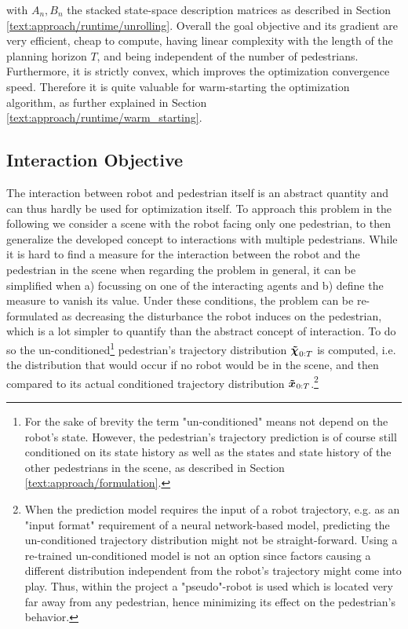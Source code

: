with $A_n, B_n$ the stacked state-space description matrices as described in Section \ref{text:approach/runtime/unrolling}. 
\newline
Overall the goal objective and its gradient are very efficient, cheap to compute, having linear complexity with the length of the planning horizon $T$, and being independent of the number of pedestrians. Furthermore, it is strictly convex, which improves the optimization convergence speed. Therefore it is quite valuable for warm-starting the optimization algorithm, as further explained in Section \ref{text:approach/runtime/warm_starting}.


\subsection{Interaction Objective}
\label{text:approach/objective/interactive}
The interaction between robot and pedestrian itself is an abstract quantity and can thus hardly be used for optimization itself. To approach this problem in the following we consider a scene with the robot facing only one pedestrian, to then generalize the developed concept to interactions with multiple pedestrians.  
\newline
While it is hard to find a measure for the interaction between the robot and the pedestrian in the scene when regarding the problem in general, it can be simplified when a) focussing on one of the interacting agents and b) define the measure to vanish its value. Under these conditions, the problem can be re-formulated as decreasing the disturbance the robot induces on the pedestrian, which is a lot simpler to quantify than the abstract concept of interaction. To do so the un-conditioned\footnote{For the sake of brevity the term "un-conditioned" means not depend on the robot's state. However, the pedestrian's trajectory prediction is of course still conditioned on its state history as well as the states and state history of the other pedestrians in the scene, as described in Section \ref{text:approach/formulation}.} pedestrian's trajectory distribution $\xpedwo[]_{0:T}$ is computed, i.e. the distribution that would occur if no robot would be in the scene, and then compared to its actual conditioned trajectory distribution $\xped[]_{0:T}$.\footnote{When the prediction model requires the input of a robot trajectory, e.g. as an "input format" requirement of a neural network-based model, predicting the un-conditioned trajectory distribution might not be straight-forward. Using a re-trained un-conditioned model is not an option since factors causing a different distribution independent from the robot's trajectory might come into play. Thus, within the project a "pseudo"-robot is used which is located very far away from any pedestrian, hence minimizing its effect on the pedestrian's behavior.}


